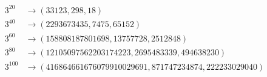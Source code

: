 \documentclass[11pt]{article}
\begin{document}
\begin{equation*}
\begin{split}
3^{20}  &\rightarrow (33123, 298, 18) \\
3^{40}  &\rightarrow (2293673435, 7475, 65152) \\
3^{60}  &\rightarrow (158808187801698, 13757728, 2512848) \\
3^{80}  &\rightarrow (12105097562203174223, 2695483339, 494638230) \\
3^{100}  &\rightarrow (416864661676079910029691, 871747234874, 222233029040) \\
\end{split}
\end{equation*}
\end{document}
